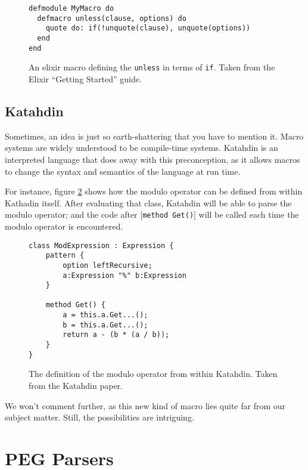 \begin{figure}[here]
\small
\begin{lstlisting}[frame=single]
defmodule MyMacro do
  defmacro unless(clause, options) do
    quote do: if(!unquote(clause), unquote(options))
  end
end
\end{lstlisting}
\caption{An elixir macro defining the \texttt{unless} in terms of
  \texttt{if}. Taken from the Elixir ``Getting Started''
  guide. \cite{elixir_macros}}
\label{elixir_example}
\end{figure}

\subsection{Katahdin}

Sometimes, an idea is just so earth-shattering that you have to mention
it. Macro systems are widely understood to be compile-time systems. Katahdin
\cite{katahdin} is an interpreted language that does away with this
preconception, as it allows macros to change the syntax and semantics of the
language at run time.

For instance, figure \ref{katahdin_example} shows how the modulo operator can be
defined from within Kathadin itself. After evaluating that class, Katahdin will
be able to parse the modulo operator; and the code after [\texttt{method Get()}]
will be called each time the modulo operator is encountered.

\begin{figure}[here]
\small
\begin{lstlisting}[frame=single]
class ModExpression : Expression {
    pattern {
        option leftRecursive;
        a:Expression "%" b:Expression
    }

    method Get() {
        a = this.a.Get...();
        b = this.a.Get...();
        return a - (b * (a / b));
    }
}
\end{lstlisting}
\caption{The definition of the modulo operator from within Katahdin. Taken from
  the Katahdin paper. \cite{katahdin}}
\label{katahdin_example}
\end{figure}

We won't comment further, as this new kind of macro lies quite far from our
subject matter. Still, the possibilities are intriguing.

\section{PEG Parsers}


